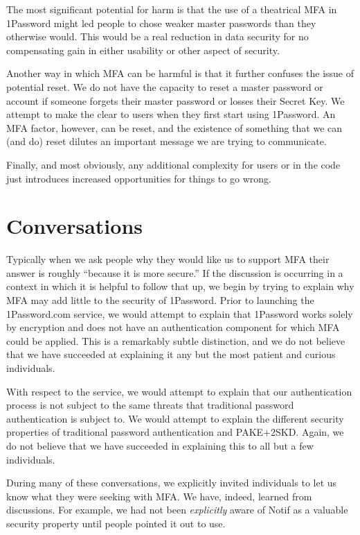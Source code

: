 \documentclass[12pt]{article}
\newcommand{\prop}[1]{\textsf{#1}}
\begin{document}
The most significant potential for harm is that the use of a theatrical MFA in 1Password might led people to chose weaker master passwords than they otherwise would. This would be a real reduction in data security for no compensating gain in either usability or other aspect of security.

Another way in which MFA can be harmful is that it further confuses the issue of potential reset. We do not have the capacity to reset a master password or account if someone forgets their master password or losses their Secret Key. We attempt to make the clear to users when they first start using 1Password. An MFA factor, however, can be reset, and the existence of something that we can (and do) reset dilutes an important message we are trying to communicate.

Finally, and most obviously, any additional complexity for users or in the code just introduces increased opportunities for things to go wrong.

\section{Conversations}

Typically when we ask people why they would like us to support MFA their answer is roughly “because it is more secure.” 
If the discussion is occurring in a context in which it is helpful to follow that up,
we begin by trying to explain why MFA may add little to the security of 1Password.
Prior to launching the 1Password.com service, we would attempt to explain that
1Password works solely by encryption and does not have an authentication component for which MFA could be applied.
This is a remarkably subtle distinction,
and we do not believe that we have succeeded at explaining it any but the
most patient and curious individuals.

With respect to the service, we would attempt to explain that our authentication process is not subject to the same threats that traditional password authentication is subject to.
We would attempt to explain the different security properties of traditional password authentication and PAKE+2SKD.
Again, we do not believe that we have succeeded in explaining this to all but
a few individuals.

During many of these conversations,
we explicitly invited individuals to let us know what they were seeking with MFA\@.
We have, indeed, learned from discussions.
For example, we had not been \emph{explicitly} aware of \prop{Notif} as a valuable security property until people pointed it out to use.
\end{document}
